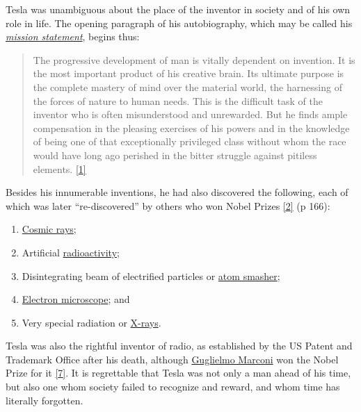 \documentclass[
  a4paper,
]{article}
\providecommand{\tightlist}{%
  \setlength{\itemsep}{0pt}\setlength{\parskip}{0pt}}
\begin{document}
Tesla was unambiguous about the place of the inventor in society and of
his own role in life. The opening paragraph of his autobiography, which
may be called his
\href{https://en.wikipedia.org/wiki/Mission_statement}{\emph{mission
statement}}, begins thus:

\begin{quote}
The progressive development of man is vitally dependent on invention. It
is the most important product of his creative brain. Its ultimate
purpose is the complete mastery of mind over the material world, the
harnessing of the forces of nature to human needs. This is the difficult
task of the inventor who is often misunderstood and unrewarded. But he
finds ample compensation in the pleasing exercises of his powers and in
the knowledge of being one of that exceptionally privileged class
without whom the race would have long ago perished in the bitter
struggle against pitiless elements.
\protect\hyperlink{ref-john83}{{[}1{]}}
\end{quote}

Besides his innumerable inventions, he had also discovered the
following, each of which was later ``re-discovered'' by others who won
Nobel Prizes \protect\hyperlink{ref-oneill80}{{[}2{]}} (p 166):

\begin{enumerate}
\tightlist
\item
  \href{https://en.wikipedia.org/wiki/Cosmic_ray}{Cosmic rays};
\item
  Artificial
  \href{https://www.britannica.com/science/radioactivity}{radioactivity};
\item
  Disintegrating beam of electrified particles or
  \href{https://en.wikipedia.org/wiki/Particle_accelerator}{atom
  smasher};
\item
  \href{https://en.wikipedia.org/wiki/Electron_microscope}{Electron
  microscope}; and
\item
  Very special radiation or
  \href{https://en.wikipedia.org/wiki/X-ray}{X-rays}.
\end{enumerate}

Tesla was also the rightful inventor of radio, as established by the US
Patent and Trademark Office after his death, although
\href{https://en.wikipedia.org/wiki/Guglielmo_Marconi}{Guglielmo
Marconi} won the Nobel Prize for it
\protect\hyperlink{ref-tesla-home}{{[}7{]}}. It is regrettable that
Tesla was not only a man ahead of his time, but also one whom society
failed to recognize and reward, and whom time has literally forgotten.
\end{document}
